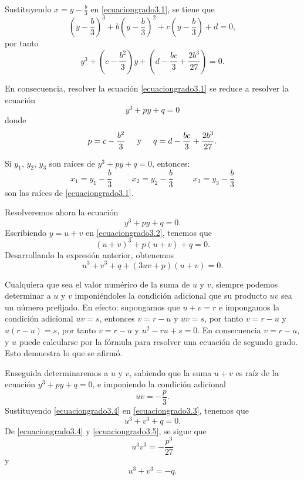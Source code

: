 Sustituyendo $\displaystyle x=y-\frac{b}{3}$ en \eqref{ecuaciongrado3.1}, se tiene que
$$\left( y-\frac{b}{3} \right)^3+b \left( y-\frac{b}{3} \right)^2+c \left( y-\frac{b}{3} \right) +d=0,$$
por tanto
$$y^3+\left( c-\frac{b^2}{3} \right) y + \left( d-\frac{bc}{3}+\frac{2b^3}{27} \right) =0.$$\newpage

En consecuencia, resolver la ecuación \eqref{ecuaciongrado3.1} se reduce a resolver la ecuación
$$y^3+py+q=0$$
donde
$$p=c-\frac{b^2}{3} \hspace{0.5cm} \text{y} \hspace{0.5cm} q=d-\frac{bc}{3}+\frac{2b^3}{27}.$$

Si $y_1$, $y_2$, $y_3$ son raíces de $y^3+py+q=0$, entonces:
$$x_1=y_1-\frac{b}{3} \hspace{1cm} x_2=y_2-\frac{b}{3} \hspace{1cm} x_3=y_3-\frac{b}{3}$$
son las raíces de \eqref{ecuaciongrado3.1}.

Resolveremos ahora la ecuación
\begin{equation}
    y^3+py+q=0. \label{ecuaciongrado3.2}
\end{equation}
Escribiendo $y=u+v$ en \eqref{ecuaciongrado3.2}, tenemos que
$$(u+v)^3+p(u+v)+q=0.$$
Desarrollando la expresión anterior, obtenemos
\begin{equation}
    u^3+v^3+q+(3uv+p)(u+v)=0. \label{ecuaciongrado3.3}
\end{equation}

Cualquiera que sea el valor numérico de la suma de $u$ y $v$, siempre podemos determinar a $u$ y $v$ imponiéndoles la condición adicional que su producto $uv$ sea un número prefijado. En efecto: supongamos que $u+v=r$ e impongamos la condición adicional $uv=s$, entonces $v=r-u$ y $uv=s$, por tanto $v=r-u$ y $u(r-u)=s$, por tanto $v=r-u$ y $u^2-r u+s=0$. En consecuencia $v=r-u$, y $u$ puede calcularse por la fórmula para resolver una ecuación de segundo grado. Esto demuestra lo que se afirmó.

Enseguida determinaremos a $u$ y $v$, sabiendo que la suma $u+v$ es raíz de la ecuación $y^3+p y+q=0$, e imponiendo la condición adicional
\begin{equation}
    uv=-\frac{p}{3}. \label{ecuaciongrado3.4}
\end{equation}
Sustituyendo \eqref{ecuaciongrado3.4} en \eqref{ecuaciongrado3.3}, tenemos que
\begin{equation}
    u^3+v^3+q=0. \label{ecuaciongrado3.5}
\end{equation}
De \eqref{ecuaciongrado3.4} y \eqref{ecuaciongrado3.5}, se sigue que
\begin{equation}
    u^3v^3=-\frac{p^3}{27} \label{ecuaciongrado3.6}
\end{equation}
y
\begin{equation}
    u^3+v^3=-q. \label{ecuaciongrado3.7}
\end{equation}

